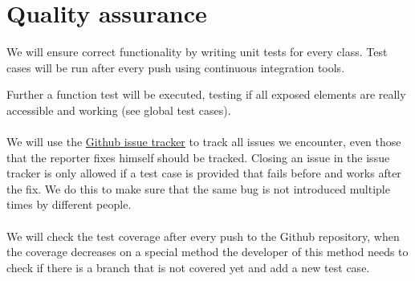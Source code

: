 \chapter{Quality assurance}
We will ensure correct functionality by writing unit tests for every class. Test cases will be run after every push using continuous integration tools.

Further a function test will be executed, testing if all exposed elements are really accessible and working (see global test cases).
\\\\
We will use the \hyperlink{https://github.com/rootjs/rootjs/issues }{Github issue tracker} to track all issues we encounter, even those that the reporter fixes himself should be tracked.
Closing an issue in the issue tracker is only allowed if a test case is provided that fails before and works after the fix. We do this to make sure that the same bug is not introduced multiple times by different people.
\\\\
We will check the test coverage after every push to the Github repository, when the coverage decreases on a special method the developer of this method needs to check if there is a branch that is not covered yet and add a new test case.
